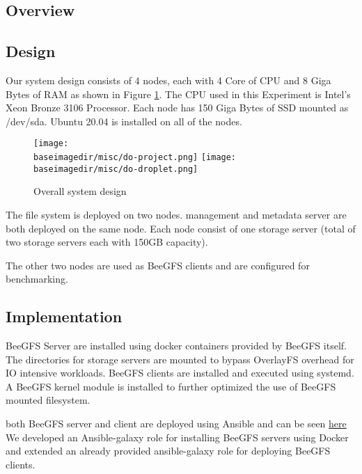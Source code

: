 \documentclass{article}
\newcommand{\baseimagedir}{..}
\begin{document}
\subsection{Overview}

\subsection{Design}
Our system design consists of 4 nodes, each with 4 Core of CPU and 8 Giga Bytes of RAM as shown in Figure \ref{fig:overal-system-design}. The CPU used in this Experiment is Intel's Xeon Bronze 3106 Processor. Each node has 150 Giga Bytes of SSD mounted as /dev/sda. Ubuntu 20.04 is installed on all of the nodes. 

\begin{figure}
    \centering
    \texttt{[image: \\baseimagedir/misc/do-project.png]}
    \texttt{[image: \\baseimagedir/misc/do-droplet.png]}
    \caption{Overall system design}
    \label{fig:overal-system-design}
\end{figure}

The file system is deployed on two nodes. management and metadata server are both deployed on the same node. Each node consist of one storage server (total of two storage servers each with 150GB capacity).

The other two nodes are used as BeeGFS clients and are configured for benchmarking.


\subsection{Implementation}
BeeGFS Server are installed using docker containers provided by BeeGFS itself. The directories for storage servers are mounted to bypass OverlayFS overhead for IO intensive workloads.
BeeGFS clients are installed and executed using systemd. A BeeGFS kernel module is installed to further optimized the use of BeeGFS mounted filesystem.

both BeeGFS server and client are deployed using Ansible and can be seen \hyperlink{https://github.com/Parsa2820/BeeGFS-Benchmark/tree/master/ansible}{here}
We developed an Ansible-galaxy role for installing BeeGFS servers using Docker and extended an already provided ansible-galaxy role for deploying BeeGFS clients. 
\end{document}
